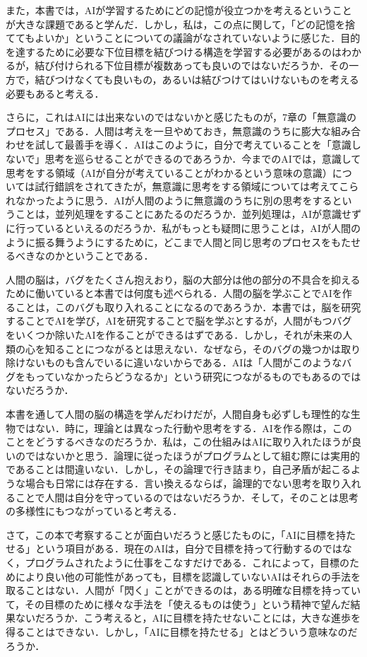 \documentclass{jarticle}
\begin{document}
また，本書では，AIが学習するためにどの記憶が役立つかを考えるということが大きな課題であると学んだ．しかし，私は，この点に関して，「どの記憶を捨ててもよいか」ということについての議論がなされていないように感じた．目的を達するために必要な下位目標を結びつける構造を学習する必要があるのはわかるが，結び付けられる下位目標が複数あっても良いのではないだろうか．その一方で，結びつけなくても良いもの，あるいは結びつけてはいけないものを考える必要もあると考える．

さらに，これはAIには出来ないのではないかと感じたものが，7章の「無意識のプロセス」である．人間は考えを一旦やめておき，無意識のうちに膨大な組み合わせを試して最善手を導く．AIはこのように，自分で考えていることを「意識しないで」思考を巡らせることができるのであろうか．今までのAIでは，意識して思考をする領域（AIが自分が考えていることがわかるという意味の意識）については試行錯誤をされてきたが，無意識に思考をする領域については考えてこられなかったように思う．AIが人間のように無意識のうちに別の思考をするということは，並列処理をすることにあたるのだろうか．並列処理は，AIが意識せずに行っているといえるのだろうか．私がもっとも疑問に思うことは，AIが人間のように振る舞うようにするために，どこまで人間と同じ思考のプロセスをもたせるべきなのかということである．

人間の脳は，バグをたくさん抱えおり，脳の大部分は他の部分の不具合を抑えるために働いていると本書では何度も述べられる．人間の脳を学ぶことでAIを作ることは，このバグも取り入れることになるのであろうか．本書では，脳を研究することでAIを学び，AIを研究することで脳を学ぶとするが，人間がもつバグをいくつか除いたAIを作ることができるはずである．しかし，それが未来の人類の心を知ることにつながるとは思えない．なぜなら，そのバグの幾つかは取り除けないものも含んでいるに違いないからである．AIは「人間がこのようなバグをもっていなかったらどうなるか」という研究につながるものでもあるのではないだろうか．

本書を通して人間の脳の構造を学んだわけだが，人間自身も必ずしも理性的な生物ではない．時に，理論とは異なった行動や思考をする．AIを作る際は，このことをどうするべきなのだろうか．私は，この仕組みはAIに取り入れたほうが良いのではないかと思う．論理に従ったほうがプログラムとして組む際には実用的であることは間違いない．しかし，その論理で行き詰まり，自己矛盾が起こるような場合も日常には存在する．言い換えるならば，論理的でない思考を取り入れることで人間は自分を守っているのではないだろうか．そして，そのことは思考の多様性にもつながっていると考える．

さて，この本で考察することが面白いだろうと感じたものに，「AIに目標を持たせる」という項目がある．現在のAIは，自分で目標を持って行動するのではなく，プログラムされたように仕事をこなすだけである．これによって，目標のためにより良い他の可能性があっても，目標を認識していないAIはそれらの手法を取ることはない．人間が「閃く」ことができるのは，ある明確な目標を持っていて，その目標のために様々な手法を「使えるものは使う」という精神で望んだ結果ないだろうか．こう考えると，AIに目標を持たせないことには，大きな進歩を得ることはできない．しかし，「AIに目標を持たせる」とはどういう意味なのだろうか．
\end{document}
